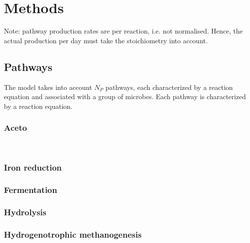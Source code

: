 \documentclass{article}
\begin{document}
\glsaddallunused

\printglossary[title=List of Symbols,%
               toctitle=List of Symbols,%
               type=symbols,%
               style=list,%
               nogroupskip,%
               nonumberlist]

\newcommand{\Sdis}{S^{\mathrm{dis}}}
\newcommand{\cuej}{\mathrm{CUE}_j}
\newcommand{\cotwo}{\ensuremath{\mathrm{CO_2}}\xspace}
\newcommand{\chfour}{\ensuremath{\mathrm{CH_4}}\xspace}
\newcommand{\htwo}{\ensuremath{\mathrm{H_2}}\xspace}
\newcommand{\fethree}{\ensuremath{\mathrm{Fe}^{3+}}\xspace}

\section{Methods}


Note: pathway production rates are per reaction, i.e. not normalised. Hence, the actual production per day must take the stoichiometry into account.

\subsection{Pathways}

The model takes into account $N_P$ pathways, each characterized by a reaction equation and associated with a group of microbes.
Each pathway is characterized by a reaction equation.

\subsubsection{Aceto}
\\

\subsubsection{Iron reduction}


\subsubsection{Fermentation}


\subsubsection{Hydrolysis}


\subsubsection{Hydrogenotrophic methanogenesis}
\end{document}
